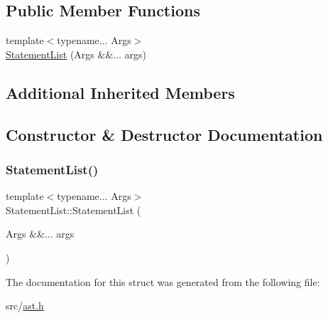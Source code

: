 \subsection*{Public Member Functions}
\begin{DoxyCompactItemize}
\item 
{\footnotesize template$<$typename... Args$>$ }\\\hyperlink{struct_statement_list_a9e3154be364d96ab840141257183b204}{Statement\+List} (Args \&\&... args)
\end{DoxyCompactItemize}
\subsection*{Additional Inherited Members}


\subsection{Constructor \& Destructor Documentation}
\mbox{\label{struct_statement_list_a9e3154be364d96ab840141257183b204}} 
\subsubsection{\texorpdfstring{Statement\+List()}{StatementList()}}
{\footnotesize\ttfamily template$<$typename... Args$>$ \\
Statement\+List\+::\+Statement\+List (\begin{DoxyParamCaption}\item[{Args \&\&...}]{args }\end{DoxyParamCaption})\hspace{0.3cm}{\ttfamily [inline]}}



The documentation for this struct was generated from the following file\+:\begin{DoxyCompactItemize}
\item 
src/\hyperlink{ast_8h}{ast.\+h}\end{DoxyCompactItemize}
